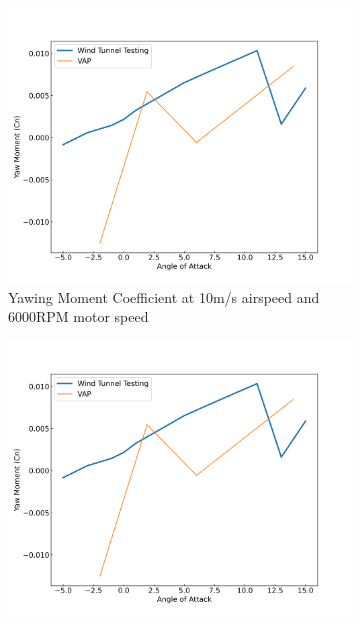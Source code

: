 \begin{figure}[H]
    \centering
    \begin{subfigure}[b]{0.467\textwidth}
        \centering
        \includegraphics[width=\textwidth]{05_Results/VAP/tractor/Cn/10ms_11000RPM_Cn.png}
        \caption{Yawing Moment Coefficient at 10m/s airspeed and 6000RPM motor speed}
        \label{fig:VAP_Cn_10ms_6000}
    \end{subfigure}
    \begin{subfigure}[b]{0.467\textwidth}
        \centering
        \includegraphics[width=\textwidth]{05_Results/VAP/tractor/Cn/10ms_11000RPM_Cn.png}

\end{subfigure}
\end{figure}
